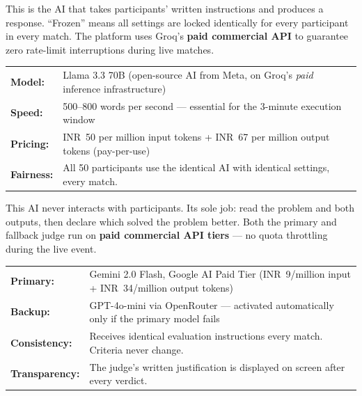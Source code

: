 \documentclass[11pt, a4paper]{article}
\begin{document}
\begin{tcolorbox}[greenbox, title={The Battle AI --- ``The Frozen Model'' (What participants compete to control)}]
This is the AI that takes participants' written instructions and produces a response. ``Frozen'' means all settings are locked identically for every participant in every match. The platform uses Groq's \textbf{paid commercial API} to guarantee zero rate-limit interruptions during live matches.

\smallskip
\begin{tabularx}{\linewidth}{@{}>{\bfseries}l X@{}}
Model:    & Llama 3.3 70B (open-source AI from Meta, on Groq's \textit{paid} inference infrastructure) \\
Speed:    & 500--800 words per second --- essential for the 3-minute execution window \\
Pricing:  & INR~50 per million input tokens + INR~67 per million output tokens (pay-per-use) \\
Fairness: & All 50 participants use the identical AI with identical settings, every match. \\
\end{tabularx}
\end{tcolorbox}

\begin{tcolorbox}[purplebox, title={The Judge AI --- The Impartial Evaluator (Separate from everything else)}]
This AI never interacts with participants. Its sole job: read the problem and both outputs, then declare which solved the problem better. Both the primary and fallback judge run on \textbf{paid commercial API tiers} --- no quota throttling during the live event.

\smallskip
\begin{tabularx}{\linewidth}{@{}>{\bfseries}l X@{}}
Primary:      & Gemini 2.0 Flash, Google AI Paid Tier (INR~9/million input + INR~34/million output tokens) \\
Backup:       & GPT-4o-mini via OpenRouter --- activated automatically only if the primary model fails \\
Consistency:  & Receives identical evaluation instructions every match. Criteria never change. \\
Transparency: & The judge's written justification is displayed on screen after every verdict. \\
\end{tabularx}
\end{tcolorbox}
\end{document}
